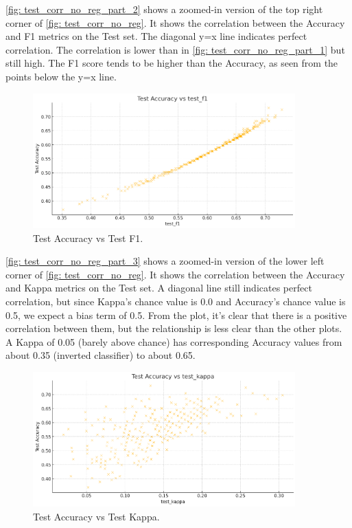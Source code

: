 \autoref{fig: test_corr_no_reg_part_2} shows a zoomed-in version of the top right corner of \autoref{fig: test_corr_no_reg}. It shows the correlation between the Accuracy and F1 metrics on the Test set. The diagonal y=x line indicates perfect correlation. The correlation is lower than in \autoref{fig: test_corr_no_reg_part_1} but still high. The F1 score tends to be higher than the Accuracy, as seen from the points below the y=x line.

\begin{figure}[H]
    \centering
    \includegraphics[width=0.9\textwidth]{Figures/results/acc_corr_no_reg_part_2.png}
    \caption{Test Accuracy vs Test F1.}
    \label{fig: test_corr_no_reg_part_2}
\end{figure}

\autoref{fig: test_corr_no_reg_part_3} shows a zoomed-in version of the lower left corner of \autoref{fig: test_corr_no_reg}. It shows the correlation between the Accuracy and Kappa metrics on the Test set. A diagonal line still indicates perfect correlation, but since Kappa's chance value is 0.0 and Accuracy's chance value is 0.5, we expect a bias term of 0.5. From the plot, it's clear that there is a positive correlation between them, but the relationship is less clear than the other plots. A Kappa of 0.05 (barely above chance) has corresponding Accuracy values from about 0.35 (inverted classifier) to about 0.65.

\begin{figure}[H]
    \centering
    \includegraphics[width=0.9\textwidth]{Figures/results/acc_corr_no_reg_part_3.png}
    \caption{Test Accuracy vs Test Kappa.}
    \label{fig: test_corr_no_reg_part_3}
\end{figure}

